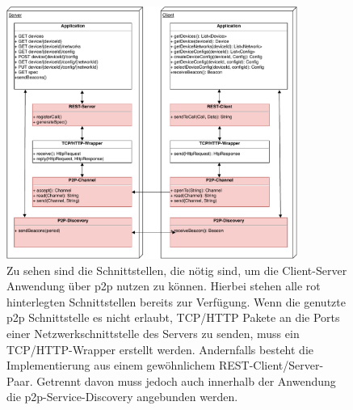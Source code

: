     \pagebreak
    \section*{\contentsname}
    \pagebreak

    \begin{leveldown}
    
    
    \pagebreak
    
    
	\begin{figure}[ht]
		\centering
	    \includegraphics[width=0.85\textwidth]{../latex-ai-project/IOT-Connectivity-Protocol-Stack}
    	\caption[]{Zu sehen sind die Schnittstellen, die nötig sind, um die Client-Server Anwendung über p2p nutzen zu können. Hierbei stehen alle rot hinterlegten Schnittstellen bereits zur Verfügung. Wenn die genutzte p2p Schnittstelle es nicht erlaubt, TCP/HTTP Pakete an die Ports einer Netzwerkschnittstelle des Servers zu senden, muss ein TCP/HTTP-Wrapper erstellt werden. Andernfalls besteht die Implementierung aus einem gewöhnlichem REST-Client/Server-Paar. Getrennt davon muss jedoch auch innerhalb der Anwendung die p2p-Service-Discovery angebunden werden. }
	    \label{protocol_stack}
	\end{figure}     
    
    
    

\end{leveldown}
